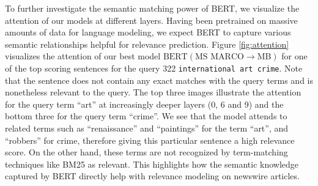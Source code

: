 To further investigate the semantic matching power of BERT, we visualize the attention of our models at different layers.
Having been pretrained on massive amounts of data for language modeling, we expect BERT to capture various semantic relationships helpful for relevance prediction.
Figure \ref{fig:attention} visualizes the attention of our best model $ \textrm{BERT} (\textrm{MS MARCO}\rightarrow\textrm{MB}) $ for one of the top scoring sentences for the query 322 \texttt{international art crime}.
Note that the sentence does not contain any exact matches with the query terms and is nonetheless relevant to the query.
The top three images illustrate the attention for the query term ``art'' at increasingly deeper layers (0, 6 and 9) and the bottom three for the query term ``crime''.
We see that the model attends to related terms such as ``renaissance'' and ``paintings'' for the term ``art'', and ``robbers'' for crime, therefore giving this particular sentence a high relevance score.
On the other hand, these terms are not recognized by term-matching techniques like BM25 as relevant.
This highlights how the semantic knowledge captured by BERT directly help with relevance modeling on newswire articles.



